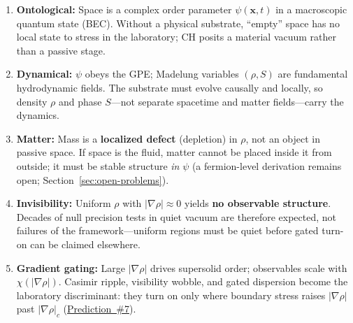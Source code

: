 \documentclass[11pt,a4paper]{article}
\begin{document}
\begin{enumerate}[label=\textbf{\arabic*.}, leftmargin=*]
  \item \textbf{Ontological:} Space is a complex order parameter $\psi(\mathbf{x},t)$ in a macroscopic quantum state (BEC).
  Without a physical substrate, ``empty'' space has no local state to stress in the laboratory; CH posits a material vacuum rather than a passive stage.

  \item \textbf{Dynamical:} $\psi$ obeys the GPE; Madelung variables $(\rho, S)$ are fundamental hydrodynamic fields.
  The substrate must evolve causally and locally, so density $\rho$ and phase $S$---not separate spacetime and matter fields---carry the dynamics.

  \item \textbf{Matter:} Mass is a \textbf{localized defect} (depletion) in $\rho$, not an object in passive space.
  If space is the fluid, matter cannot be placed inside it from outside; it must be stable structure \emph{in} $\psi$ (a fermion-level derivation remains open; Section~\ref{sec:open-problems}).

  \item \textbf{Invisibility:} Uniform $\rho$ with $|\nabla\rho| \approx 0$ yields \textbf{no observable structure}.
  Decades of null precision tests in quiet vacuum are therefore expected, not failures of the framework---uniform regions must be quiet before gated turn-on can be claimed elsewhere.

  \item \textbf{Gradient gating:} Large $|\nabla\rho|$ drives supersolid order; observables scale with $\chi(|\nabla\rho|)$.
  Casimir ripple, visibility wobble, and gated dispersion become the laboratory discriminant: they turn on only where boundary stress raises $|\nabla\rho|$ past $|\nabla\rho|_c$ (\hyperref[sec:protocol]{Prediction~\#7}).


\end{enumerate}
\end{document}
